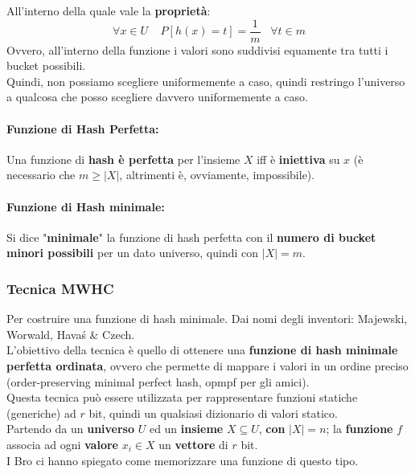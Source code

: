 All'interno della quale vale la \textbf{proprietà}:
$$ \forall x \in U\;\;\;\; P [h(x) = t] = \frac{1}{m} \;\;\; \forall t \in m$$
Ovvero, all'interno della funzione i valori sono suddivisi equamente tra tutti i bucket possibili.\\

Quindi, non possiamo scegliere uniformemente a caso, quindi restringo l'universo a qualcosa che posso scegliere davvero uniformemente a caso.\\

\paragraph{Funzione di Hash Perfetta:} Una funzione di \textbf{hash è perfetta} per l'insieme $X$ iff è \textbf{iniettiva} su $x$ (è necessario che $m \geq |X|$, altrimenti è, ovviamente, impossibile).\\

\paragraph{Funzione di Hash minimale:} Si dice "\textbf{minimale}" la funzione di hash perfetta con il \textbf{numero di bucket minori possibili} per un dato universo, quindi con $|X| = m$.\\

\newpage

\subsubsection{Tecnica MWHC}

Per costruire una funzione di hash minimale. Dai nomi degli inventori: Majewski, Worwald, Hava\'s \& Czech.\\ %

L'obiettivo della tecnica è quello di ottenere una \textbf{funzione di hash minimale perfetta ordinata}, ovvero che permette di mappare i valori in un ordine preciso (order-preserving minimal perfect hash, opmpf per gli amici).\\
Questa tecnica può essere utilizzata per rappresentare funzioni statiche (generiche) ad $r$ bit, quindi un qualsiasi dizionario di valori statico.\\

Partendo da un \textbf{universo} $U$ ed un \textbf{insieme} $X \subseteq U$, \textbf{con} $|X| = n$; la \textbf{funzione} $f$ associa ad ogni \textbf{valore} $x_i \in X$ un \textbf{vettore} di $r$ bit.\\
I Bro ci hanno spiegato come memorizzare una funzione di questo tipo.\\

